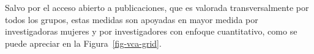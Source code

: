 \documentclass[
  letterpaper,
  DIV=11,
  numbers=noendperiod]{scrreprt}
\begin{document}
Salvo por el acceso abierto a publicaciones, que es valorada
transversalmente por todos los grupos, estas medidas son apoyadas en
mayor medida por investigadoras mujeres y por investigadores con enfoque
cuantitativo, como se puede apreciar en la Figura~\ref{fig-vca-grid}.

\begin{figure}

\begin{minipage}[t]{\linewidth}

{\centering 


}

\end{minipage}%
\newline
\begin{minipage}[t]{\linewidth}

{\centering 

}
\end{minipage}
\end{figure}
\end{document}
